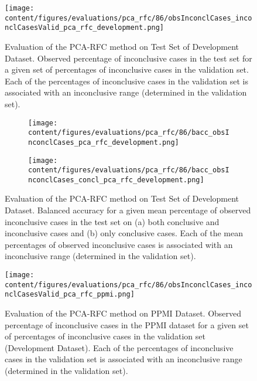 \begin{figure}[h]
  \centering
  \texttt{[image: content/figures/evaluations/pca\_rfc/86/obsInconclCases\_inconclCasesValid\_pca\_rfc\_development.png]}
  \caption{Evaluation of the PCA-RFC method on Test Set of Development Dataset.
  Observed percentage of inconclusive cases in the test set 
  for a given set of percentages of inconclusive cases in the validation set.
  Each of the percentages of inconclusive cases in the validation set is associated 
  with an inconclusive range (determined in the validation set).} 
  \label{fig:obsInconclCases_inconclCasesValid_pca_rfc_development}
\end{figure} 


\begin{figure}[t]
  \begin{subfigure}{0.9\textwidth}
    \centering
    \texttt{[image: content/figures/evaluations/pca\_rfc/86/bacc\_obsInconclCases\_pca\_rfc\_development.png]}
    \subcaption{}
    \label{fig:bacc_obsInconclCases_pca_rfc_development}
  \end{subfigure}
  \hfill
  \begin{subfigure}{0.9\textwidth}
    \centering
    \texttt{[image: content/figures/evaluations/pca\_rfc/86/bacc\_obsInconclCases\_concl\_pca\_rfc\_development.png]}
    \subcaption{}
    \label{fig:bacc_obsInconclCases_concl_pca_rfc_development}
  \end{subfigure}

  \caption{Evaluation of the PCA-RFC method on Test Set of Development Dataset.
  Balanced accuracy for a given mean percentage of observed inconclusive cases in the test set on 
  (a) both conclusive and inconclusive cases and (b) only conclusive cases. 
  Each of the mean percentages of observed inconclusive cases is associated with an inconclusive range (determined in the validation set). }
  \label{fig:bacc_obsInconclCases_pca_rfc_development_full}
\end{figure}




\begin{figure}[h]
\centering
\texttt{[image: content/figures/evaluations/pca\_rfc/86/obsInconclCases\_inconclCasesValid\_pca\_rfc\_ppmi.png]}
\caption{Evaluation of the PCA-RFC method on PPMI Dataset.
Observed percentage of inconclusive cases in the PPMI dataset 
for a given set of percentages of inconclusive cases in the validation set (Development Dataset).
Each of the percentages of inconclusive cases in the validation set is associated 
with an inconclusive range (determined in the validation set).} 
\label{fig:obsInconclCases_inconclCasesValid_pca_rfc_ppmi}
\end{figure} 


